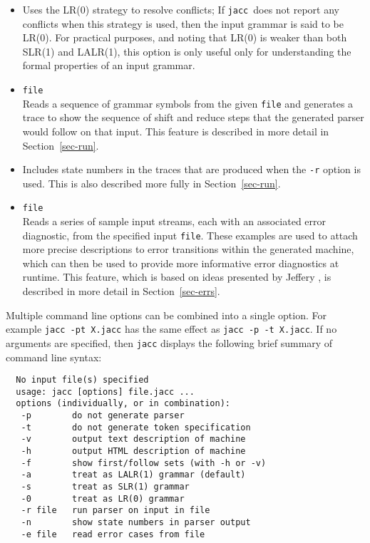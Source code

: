 \documentclass[12pt]{article}
\def\jacc{{\tt jacc}}
\begin{document}
\begin{itemize}
\item[{\tt -0}]
     Uses the LR(0) strategy to resolve conflicts; If \jacc\ does
     not report any conflicts when this strategy is used, then the
     input grammar is said to be LR(0).  For practical purposes,
     and noting that LR(0) is weaker than both SLR(1) and LALR(1),
     this option is only useful only for understanding the formal
     properties of an input grammar.

\item[{\tt -r}] {\tt file} \\
     Reads a sequence of grammar symbols from the given \verb"file"
     and generates a trace to show the sequence of shift and reduce
     steps that the generated parser would follow on that input.
     This feature is described in more detail in Section~\ref{sec-run}.

\item[{\tt -n}]
     Includes state numbers in the traces that are produced
     when the \verb"-r" option is used.  This is also described
     more fully in Section~\ref{sec-run}.

\item[{\tt -e}] {\tt file} \\
     Reads a series of sample input streams, each with an
     associated error diagnostic, from the specified input
     \verb"file".  These examples are used to attach more
     precise descriptions to error transitions within the
     generated machine, which can then be used to provide
     more informative error diagnostics at runtime.  This
     feature, which is based on ideas presented by
     Jeffery \cite{Jeffery:merr}, is described in more
     detail in Section~\ref{sec-errs}.

\end{itemize}
Multiple command line options can be combined into a single
option.  For example
\verb"jacc -pt X.jacc"
has the same effect as
\verb"jacc -p -t X.jacc".
If no arguments are specified, then \verb"jacc" displays the
following brief summary of command line syntax:
\begin{verbatim}
  No input file(s) specified
  usage: jacc [options] file.jacc ...
  options (individually, or in combination):
   -p        do not generate parser
   -t        do not generate token specification
   -v        output text description of machine
   -h        output HTML description of machine
   -f        show first/follow sets (with -h or -v)
   -a        treat as LALR(1) grammar (default)
   -s        treat as SLR(1) grammar
   -0        treat as LR(0) grammar
   -r file   run parser on input in file
   -n        show state numbers in parser output
   -e file   read error cases from file
\end{verbatim}
\end{document}
